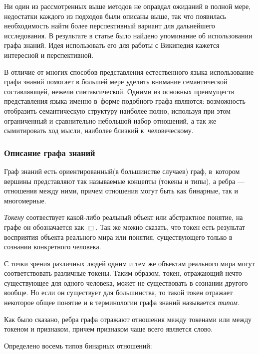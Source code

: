 Ни один из рассмотренных выше методов не оправдал ожиданий в полной мере, недостатки каждого из
подходов были описаны выше, так что появилась необходимость найти более перспективный вариант
для дальнейшего исследования. В результате в статье \cite{graph_mashable} %
было найдено упоминание об использовании графа знаний. Идея использовать его для работы с Википедия
кажется интересной и перспективной.

В отличие от многих способов представления естественного языка использование графа знаний помогает
в большей мере уделить внимание семантической составляющей, нежели синтаксической. Одними из основных
преимуществ представления языка именно в~форме подобного графа являются: возможность отобразить семантическую
структуру наиболее полно, используя при этом ограниченный и сравнительно небольшой набор отношений, а так же
сымитировать ход мысли, наиболее близкий к~человеческому.
\subsubsection {Описание графа знаний}
Граф знаний \cite{knowledge_graph} есть ориентированный(в большинстве случаев) граф, в~котором 
вершины представляют так называемые концепты (токены и типы),
а ребра --- отношения между ними, причем отношения могут быть как бинарные, так и многомерные. 

\textsl{Токену} соотвествует какой-либо реальный объект или абстрактное понятие, на графе он обозначается
как $\Box$. Так же можно сказать, что токен есть результат восприятия объекта реального мира
или понятия, существующего только в сознании конкретного человека.

С точки зрения различных людей одним и тем же объектам реального мира могут соответствовать различные токены.
Таким образом, токен, отражающий нечто существующее для одного человека, может не существовать в сознании другого
вообще. Но если он существует для большинства, то такой токен отражает некоторое общее понятие и в терминологии
графа знаний называется \textsl{типом}.


Как было сказано, ребра графа отражают отношения между токенами или между токеном и признаком, причем
признаком чаще всего является слово. 

Определено восемь типов бинарных отношений:

